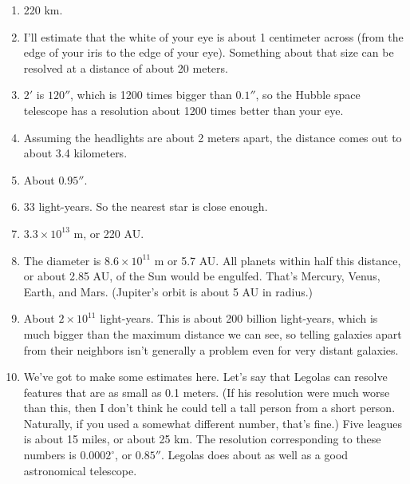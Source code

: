 \begin{enumerate}

\item 220 km.
\item I'll estimate that the white of your eye is about 1 centimeter
across (from the edge of your iris to the edge of your eye). Something
about that size can be resolved at a distance of about 20 meters.
\item $2'$ is $120''$, which is 1200 times bigger than $0.1''$, so 
the Hubble space telescope has a resolution about 1200 times better than
your eye.
\item Assuming the headlights are about 2 meters apart, the distance
comes out to about 3.4 kilometers.
\item About $0.95''$.
\item 33 light-years. So the nearest star is close enough.
\item $3.3\times 10^{13}$ m, or 220 AU.
\item The diameter is $8.6\times 10^{11}$ m or 5.7 AU. All
planets within half this distance, or about 2.85 AU, 
of the Sun would be engulfed. That's Mercury, Venus, Earth, and Mars. 
(Jupiter's orbit is about 5 AU in radius.)
\item About $2\times 10^{11}$ light-years. This is about 200 billion
light-years, which is much bigger than the maximum distance
we can see, so telling galaxies apart from their neighbors
isn't generally a problem even for very distant galaxies.
\item We've got to make some estimates here. Let's say that
Legolas can resolve features that are as small as 0.1 meters. (If
his resolution were much worse than this, then I don't think he could
tell a tall person from a short person. Naturally, if you used
a somewhat different number, that's fine.) 
Five leagues is about 15 miles, or about 25 km.
The resolution corresponding to these numbers is $0.0002^\circ$, or $0.85''$.
Legolas does about as well as a good astronomical telescope.

\end{enumerate}
